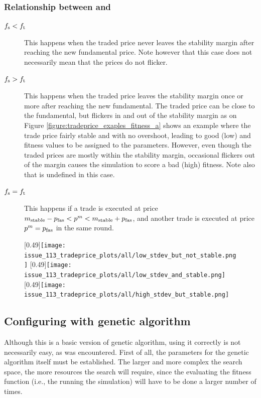 \subsubsection*{Relationship between \timetoreachnewfundamental{} and \roundstable}
\begin{description}
\item[$f_\text{s} < f_\text{t}$] This happens when the traded price never leaves the stability margin after reaching the new fundamental price. Note however that this case does not necessarily mean that the prices do not flicker. 
\item[$f_\text{s} > f_\text{t}$] This happens when the traded price leaves the stability margin once or more after reaching the new fundamental. The traded price can be close to the fundamental, but flickers in and out of the stability margin as on Figure \ref{figure:tradeprice_exaples_fitness_a} shows an example where the trade price fairly stable and with no overshoot, leading to good (low) \stdev and \overshoot fitness values to be assigned to the parameters. However, even though the traded prices are mostly within the stability margin, occasional flickers out of the margin causes the simulation to score a bad (high) \roundstable fitness. Note also that \timetoreachnewfundamental is undefined in this case. 
\item[$f_\text{s} = f_\text{t}$] This happens if a trade is executed at price $m_\text{stable} - p_\text{fas} < p^m < m_\text{stable} + p_\text{fas}$, and another trade is executed at price $p^m = p_\text{fas}$ in the same round. 
\end{description}

\begin{figure}
\centering
\subcaptionbox{\label{figure:tradeprice_exaples_fitness_a}}
[0.49\linewidth]{\texttt{[image: issue\_113\_tradeprice\_plots/all/low\_stdev\_but\_not\_stable.png]}}
\subcaptionbox{\label{figure:tradeprice_exaples_fitness_b}}
[0.49\linewidth]{\texttt{[image: issue\_113\_tradeprice\_plots/all/low\_stdev\_and\_stable.png]}}
\subcaptionbox{\label{figure:tradeprice_exaples_fitness_c}}
[0.49\linewidth]{\texttt{[image: issue\_113\_tradeprice\_plots/all/high\_stdev\_but\_stable.png]}}
\label{figure:tradeprice_exaples_fitness}
\end{figure}



\subsection{Configuring with genetic algorithm}\label{section:ga_parameters}
Although this is a basic version of genetic algorithm, using it correctly is not necessarily easy, as was encountered. First of all, the parameters for the genetic algorithm itself must be established. The larger and more complex the search space, the more resources the search will require, since the evaluating the fitness function (i.e., the running the simulation) will have to be done a larger number of times. 



